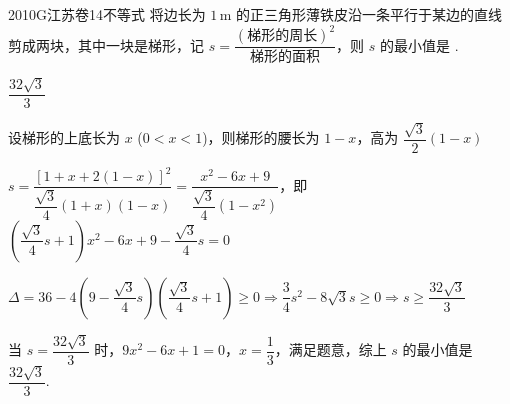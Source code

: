 
\begin{problem}{2010}{G}{江苏卷}{14}{不等式}
将边长为 $1\,\mathrm{m}$ 的正三角形薄铁皮沿一条平行于某边的直线剪成两块，其中一块是梯形，记 $ s = \dfrac{(\text{梯形的周长})^2}{\text{梯形的面积}} $，则 $ s $ 的最小值是 \underline{\hspace{4em}}.
\end{problem}

\begin{answer}
$\dfrac{32\sqrt{3}}{3}$
\end{answer}

\begin{solutions}
设梯形的上底长为 $ x $ ($ 0 < x < 1 $)，则梯形的腰长为 $ 1 - x $，高为 $ \dfrac{\sqrt{3}}{2}(1 - x) $

$ s = \dfrac{[1 + x + 2(1 - x)]^2}{\dfrac{\sqrt{3}}{4}(1 + x)(1 - x)} = \dfrac{x^2 - 6x + 9}{\dfrac{\sqrt{3}}{4}(1 - x^2)} $，即 $ \left( \dfrac{\sqrt{3}}{4}s + 1 \right)x^2 - 6x + 9 - \dfrac{\sqrt{3}}{4}s = 0 $

$ \Delta = 36 - 4\left(9 - \dfrac{\sqrt{3}}{4}s\right)\left(\dfrac{\sqrt{3}}{4}s + 1\right) \geqslant 0 \Rightarrow \dfrac{3}{4}s^2 - 8\sqrt{3}s \geqslant 0 \Rightarrow s \geqslant \dfrac{32\sqrt{3}}{3} $

当 $ s = \dfrac{32\sqrt{3}}{3} $ 时，$ 9x^2 - 6x + 1 = 0 $，$ x = \dfrac{1}{3} $，满足题意，综上 $ s $ 的最小值是 $ \dfrac{32\sqrt{3}}{3} $.
\end{solutions}